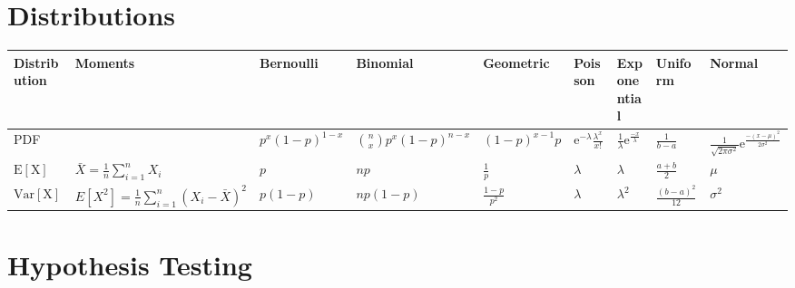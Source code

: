 \documentclass[8pt]{extarticle}
\begin{document}
\section{Distributions}

\begin{center}
    \begin{tabular}{ | l || l || l | l | l | l || l | l | l | }
    \hline
    Distribution & Moments & Bernoulli & Binomial & Geometric & Poisson & Exponential & Uniform & Normal \\ \hline

    PDF & 
        & $p^x(1-p)^{1-x}$ 
        & $\binom{n}{x}p^x(1-p)^{n-x}$
        & $(1-p)^{x-1}p$ 
        & $\mathrm{e}^{-\lambda}\frac{\lambda^x}{x!}$
        & $\frac{1}{\lambda}\mathrm{e}^{\frac{-x}{\lambda}}$ 
        & $\frac{1}{b-a}$ 
        & $\frac{1}{\sqrt{2\pi\sigma^2}}\mathrm{e}^{\frac{-(x-\mu)^2}{2\sigma^2}}$ \\ \hline

    $\mathrm{E[X]}$ & $\bar{X} = \frac{1}{n}\displaystyle\sum_{i=1}^{n} X_i$
                    & $p$ 
                    & $np$ 
                    & $\frac{1}{p}$ 
                    & $\lambda$ 
                    & $\lambda$ 
                    & $\frac{a+b}{2}$
                    & $\mu$ \\ \hline

    $\mathrm{Var[X]}$ & $E[X^2] = \frac{1}{n}\displaystyle\sum_{i=1}^{n} (X_i - \bar{X})^2$
                      & $p(1-p)$
                      & $np(1-p)$
                      & $\frac{1-p}{p^2}$ 
                      & $\lambda$
                      & $\lambda^2$
                      & $\frac{(b-a)^2}{12}$
                      & $\sigma^2$ \\ \hline
    \end{tabular}
\end{center}


\section{Hypothesis Testing}
\end{document}
